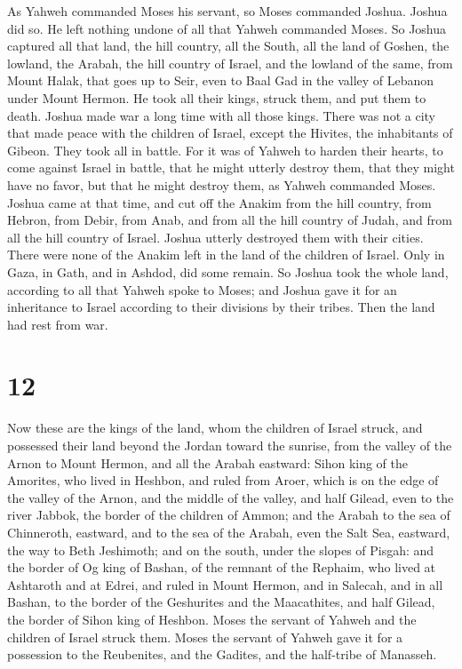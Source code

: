  As Yahweh commanded Moses his servant, so Moses commanded
Joshua. Joshua did so. He left nothing undone of all that Yahweh
commanded Moses.  So Joshua captured all that land, the
hill country, all the South, all the land of Goshen, the lowland, the
Arabah, the hill country of Israel, and the lowland of the same,
 from Mount Halak, that goes up to Seir, even to Baal Gad
in the valley of Lebanon under Mount Hermon. He took all their kings,
struck them, and put them to death.  Joshua made war a long
time with all those kings.  There was not a city that made
peace with the children of Israel, except the Hivites, the inhabitants
of Gibeon. They took all in battle.  For it was of Yahweh
to harden their hearts, to come against Israel in battle, that he might
utterly destroy them, that they might have no favor, but that he might
destroy them, as Yahweh commanded Moses.  Joshua came at
that time, and cut off the Anakim from the hill country, from Hebron,
from Debir, from Anab, and from all the hill country of Judah, and from
all the hill country of Israel. Joshua utterly destroyed them with their
cities.  There were none of the Anakim left in the land of
the children of Israel. Only in Gaza, in Gath, and in Ashdod, did some
remain.  So Joshua took the whole land, according to all
that Yahweh spoke to Moses; and Joshua gave it for an inheritance to
Israel according to their divisions by their tribes. Then the land had
rest from war.

\hypertarget{section-11}{%
\section{12}\label{section-11}}

 Now these are the kings of the land, whom the children of
Israel struck, and possessed their land beyond the Jordan toward the
sunrise, from the valley of the Arnon to Mount Hermon, and all the
Arabah eastward:  Sihon king of the Amorites, who lived in
Heshbon, and ruled from Aroer, which is on the edge of the valley of the
Arnon, and the middle of the valley, and half Gilead, even to the river
Jabbok, the border of the children of Ammon;  and the Arabah
to the sea of Chinneroth, eastward, and to the sea of the Arabah, even
the Salt Sea, eastward, the way to Beth Jeshimoth; and on the south,
under the slopes of Pisgah:  and the border of Og king of
Bashan, of the remnant of the Rephaim, who lived at Ashtaroth and at
Edrei,  and ruled in Mount Hermon, and in Salecah, and in
all Bashan, to the border of the Geshurites and the Maacathites, and
half Gilead, the border of Sihon king of Heshbon.  Moses the
servant of Yahweh and the children of Israel struck them. Moses the
servant of Yahweh gave it for a possession to the Reubenites, and the
Gadites, and the half-tribe of Manasseh.

